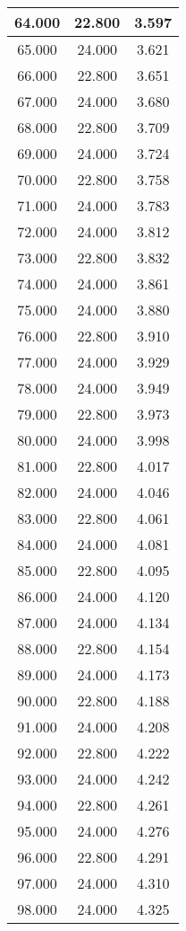 \documentclass[11pt,a4paper]{jsarticle}
\begin{document}
\begin{center}
\begin{longtable}{|c|c|c|}
64.000	 & 22.800&  3.597 \\ \hline
65.000	 & 24.000&  3.621 \\ \hline
66.000	 & 22.800&  3.651 \\ \hline
67.000	 & 24.000&  3.680 \\ \hline
68.000	 & 22.800&  3.709 \\ \hline
69.000	 & 24.000&  3.724 \\ \hline
70.000	 & 22.800&  3.758 \\ \hline
71.000	 & 24.000&  3.783 \\ \hline
72.000	 & 24.000&  3.812 \\ \hline
73.000	 & 22.800&  3.832 \\ \hline
74.000	 & 24.000&  3.861 \\ \hline
75.000	 & 24.000&  3.880 \\ \hline
76.000	 & 22.800&  3.910 \\ \hline
77.000	 & 24.000&  3.929 \\ \hline
78.000	 & 24.000&  3.949 \\ \hline
79.000	 & 22.800&  3.973 \\ \hline
80.000	 & 24.000&  3.998 \\ \hline
81.000	 & 22.800&  4.017 \\ \hline
82.000	 & 24.000&  4.046 \\ \hline
83.000	 & 22.800&  4.061 \\ \hline
84.000	 & 24.000&  4.081 \\ \hline
85.000	 & 22.800&  4.095 \\ \hline
86.000	 & 24.000&  4.120 \\ \hline
87.000	 & 24.000&  4.134 \\ \hline
88.000	 & 22.800&  4.154 \\ \hline
89.000	 & 24.000&  4.173 \\ \hline
90.000	 & 22.800&  4.188 \\ \hline
91.000	 & 24.000&  4.208 \\ \hline
92.000	 & 22.800&  4.222 \\ \hline
93.000	 & 24.000&  4.242 \\ \hline
94.000	 & 22.800&  4.261 \\ \hline
95.000	 & 24.000&  4.276 \\ \hline
96.000	 & 22.800&  4.291 \\ \hline
97.000	 & 24.000&  4.310 \\ \hline
98.000	 & 24.000&  4.325 \\ \hline

\end{longtable}
\end{center}
\end{document}
